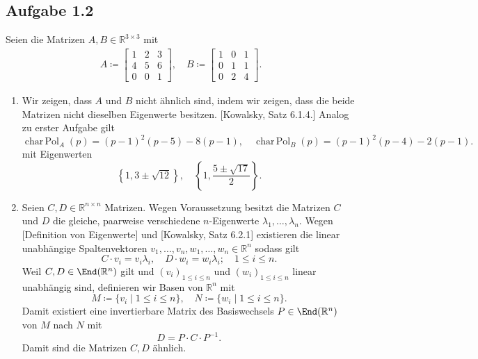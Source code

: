 \documentclass[draft,a5paper]{article}
\theoremstyle{remark}
\DeclareMathOperator{\charPol}{char\,Pol}
\begin{document}
\subsection*{Aufgabe 1.2}
Seien die Matrizen \(A, B \in \mathbb{R}^{3 \times 3}\) mit
\begin{align*}
  A \coloneq
  \begin{bmatrix}
    1 & 2 & 3 \\
    4 & 5 & 6 \\
    0 & 0 & 1
  \end{bmatrix}, \quad
  B \coloneq
  \begin{bmatrix}
    1 & 0 & 1 \\
    0 & 1 & 1 \\
    0 & 2 & 4
  \end{bmatrix}.
\end{align*}
\begin{enumerate}
\item Wir zeigen, dass \(A\) und \(B\) nicht ähnlich sind, indem wir
  zeigen, dass die beide Matrizen nicht dieselben Eigenwerte
  besitzen. [Kowalsky, Satz 6.1.4.]
  Analog zu erster Aufgabe gilt
  \[\charPol_{A}(p) = (p-1)^{2}(p-5) - 8(p-1), \quad \charPol_{B}(p) =
    (p-1)^{2}(p-4) - 2(p-1).\]
  mit Eigenwerten
  \[\left\{1, 3 \pm \sqrt{12}\right\}, \quad \left\{1, \frac{5
        \pm\sqrt{17}}{2}\right\}.\]
\item Seien \(C, D \in \mathbb{R}^{n \times n}\) Matrizen.  Wegen Voraussetzung besitzt
  die Matrizen \(C\) und \(D\) die gleiche, paarweise verschiedene
  \(n\)-Eigenwerte \(\lambda_{1}, \ldots, \lambda_{n}\).  Wegen [Definition von Eigenwerte]
  und [Kowalsky, Satz 6.2.1] existieren die linear unabhängige
  Spaltenvektoren \(v_{1}, \ldots, v_{n}, w_{1}, \ldots, w_{n} \in \mathbb{R}^{n}\) sodass gilt
  \[C \cdot v_{i} = v_{i} \lambda_{i}, \quad D \cdot w_{i} = w_{i} \lambda_{i}; \quad 1 \le i \le n.\]
  Weil \(C, D \in \End(\mathbb{R}^{n})\) gilt und
  \((v_{i})_{1 \le i \le n}\) und \((w_{i})_{1 \le i \le n}\) linear unabhängig
  sind, definieren wir Basen von \(\mathbb{R}^{n}\) mit
  \[M \coloneq \{v_{i} \mid 1 \le i \le n \}, \quad N \coloneq \{w_{i} \mid 1 \le i \le n\}.\] Damit
  existiert eine invertierbare Matrix des Basiswechsels
  \(P \in \End(\mathbb{R}^{n})\) von \(M\) nach \(N\) mit
  \[D = P \cdot C \cdot P^{-1}.\] Damit sind die Matrizen \(C, D\) ähnlich.
\end{enumerate}
\end{document}
